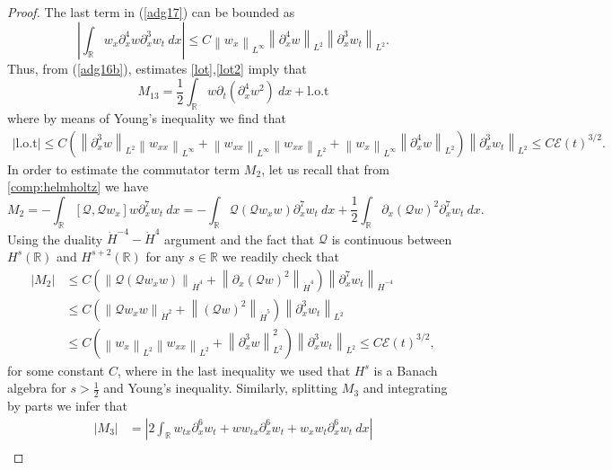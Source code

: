 \documentclass[final,11pt,a4paper,reqno]{amsart}
\newcommand{\norm}[1]{\left\| #1 \right\|}
\newcommand{\RR}{\mathbb R}
\newcommand{\pa}{\partial}
\theoremstyle{definition}
\begin{document}
\begin{proof}
The last term in (\ref{adg17}) can be bounded as
\begin{equation}\label{lot2}
\left | \int_{\RR}w_{x}\pa_{x}^{4}w \pa_{x}^{3}w_{t} \  dx \right| \leq C \norm{w_{x}}_{L^{\infty}} \norm{\pa_{x}^{4}w}_{L^{2}}\norm{ \pa_{x}^{3}w_{t}}_{L^2}.
\end{equation}
Thus, from (\ref{adg16b}), estimates \eqref{lot},\eqref{lot2} imply that
\begin{equation}\label{rewriteM13}
M_{13}=\frac{1}{2}\int_{\RR} w \pa_{t} \left( \pa_{x}^{4}w^{2}\right) \ dx +  \mbox{l.o.t}
\end{equation}
where by means of Young's inequality we find that
\begin{align*}
| \text{l.o.t}| \leq C\left(  \norm{\pa_{x}^{3}w}_{L^{2}}\norm{w_{xx}}_{L^{\infty}}+\norm{w_{xx}}_{L^{\infty}}\norm{w_{xx}}_{L^2}+\norm{w_x}_{L^{\infty}}\norm{\pa_{x}^{4}w}_{L^{2}}\right)\norm{\pa_{x}^{3}w_{t}}_{L^{2}} \leq C \mathcal{E}(t)^{3/2}.
\end{align*}
In order to estimate the commutator term $M_{2}$, let us recall that from \eqref{comp:helmholtz} we have
\[ 
M_{2}=-\int_{\RR}\left[\mathscr{Q},\mathscr{Q}w_{x} \right]w \pa_{x}^{7}w_{t} \ dx=- \int_{\RR} \mathscr{Q}\left(\mathscr{Q}w_{x}w\right)\pa_{x}^{7}w_{t} \ dx + \frac{1}{2}\int_{\RR} \pa_{x}\left(\mathscr{Q}w\right)^{2} \pa_{x}^{7}w_{t} \ dx.
\]
Using the duality $\dot{H}^{-4}-\dot{H}^{4}$ argument and the fact that  $\mathscr{Q}$ is continuous between $H^{s}(\RR)$  and $H^{s+2}(\RR)$ for any $s\in \RR$  we readily check that
\begin{align}\label{M2:estimate}
\left| M_{2} \right| &\leq C\left( \norm{\mathscr{Q}(\mathscr{Q}w_{x}w)}_{\dot{H}^{4}}+\norm{\pa_{x}(\mathscr{Q}w)^2}_{\dot{H}^{4}}\right) \norm{\pa_{x}^{7}w_{t}}_{\dot{H}^{-4}}  \nonumber \\
&\leq C\left( \norm{\mathscr{Q}w_{x}w}_{\dot{H}^{2}}+\norm{(\mathscr{Q}w)^2}_{\dot{H}^{5}}\right) \norm{\pa_{x}^{3}w_{t}}_{L^2} \nonumber \\
&\leq C\left( \norm{w_{x}}_{L^{2}}\norm{w_{xx}}_{L^{2}}+\norm{\pa_{x}^{3}w}^{2}_{L^{2}}\right) \norm{\pa_{x}^{3}w_{t}}_{L^2} \leq C \mathcal{E}(t)^{3/2},
\end{align} 
for some constant $C$, where in the last inequality we used that $H^{s}$ is a Banach algebra for $s>\frac{1}{2}$ and Young's inequality.
Similarly, splitting $M_{3}$ and integrating by parts we infer that
\begin{align}\label{M3:estimate}
|M_{3}| &= \left|2\int_{\RR}  w_{tx}\pa_{x}^{6}w_{t}+ww_{tx}\pa_{x}^{6}w_{t}+w_{x}w_{t}\pa_{x}^{6}w_{t} \  dx\right| \nonumber \\

\end{align}
\end{proof}
\end{document}
